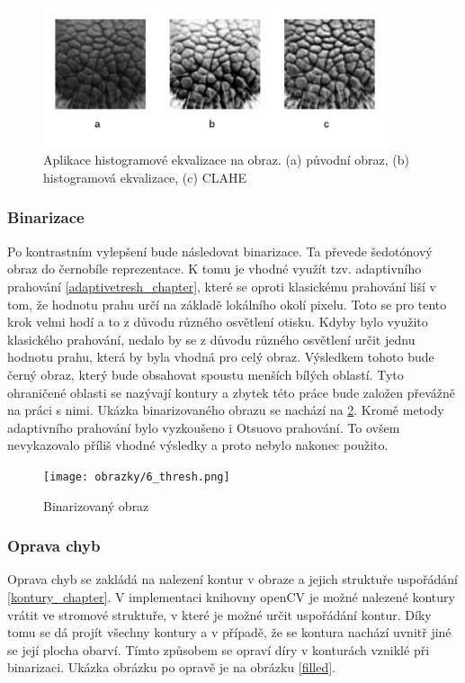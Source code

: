 \begin{figure}[h]
	\centering
	\includegraphics[width=0.9\textwidth]{obrazky/clahe2.png}
	\caption{Aplikace histogramové ekvalizace na obraz. (a) původní obraz, (b) histogramová ekvalizace, (c) CLAHE}
	\label{clahe}
\end{figure} 


\subsubsection{Binarizace}

Po kontrastním vylepšení bude následovat binarizace. Ta převede šedotónový obraz do černobíle reprezentace. K tomu je vhodné využít tzv. adaptivního prahování \ref{adaptivetresh_chapter}, které se oproti klasickému prahování liší v tom, že hodnotu prahu určí na základě lokálního okolí pixelu. Toto se pro tento krok velmi hodí a to z důvodu různého osvětlení otisku. Kdyby bylo využito klasického prahování, nedalo by se z důvodu různého osvětlení určit jednu hodnotu prahu, která by byla vhodná pro celý obraz. Výsledkem tohoto bude černý obraz, který bude obsahovat spoustu menších bílých oblastí. Tyto ohraničené oblasti se nazývají kontury a zbytek této práce bude založen převážně na práci s nimi. Ukázka binarizovaného obrazu se nachází na \ref{thresh}. Kromě metody adaptivního prahování bylo vyzkoušeno i Otsuovo prahování. To ovšem nevykazovalo příliš vhodné výsledky a proto nebylo nakonec použito.

\begin{figure}[h]
	\centering
	\texttt{[image: obrazky/6\_thresh.png]}
	\caption{Binarizovaný obraz}
	\label{thresh}
\end{figure} 

\subsubsection{Oprava chyb}

Oprava chyb se zakládá na nalezení kontur v obraze a jejich struktuře uspořádání \ref{kontury_chapter}. V implementaci knihovny openCV je možné nalezené kontury vrátit ve stromové struktuře, v které je možné určit uspořádání kontur. Díky tomu se dá projít všechny kontury a v případě, že se kontura nachází uvnitř jiné se její plocha obarví. Tímto způsobem se opraví díry v konturách vzniklé při binarizaci. Ukázka obrázku po opravě je na obrázku \ref{filled}.


